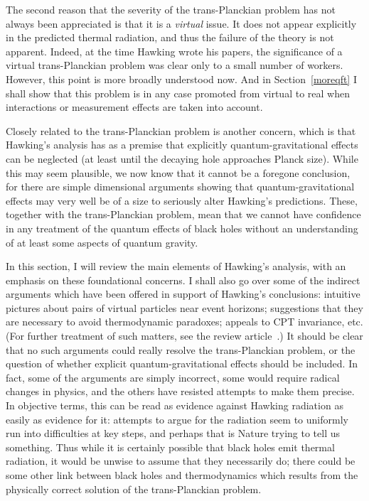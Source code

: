 \documentclass[12pt]{article}
\begin{document}
The second reason that the severity of the trans-Planckian problem has not always been appreciated is that it is a {\em virtual} issue.  It does not appear explicitly in the predicted thermal radiation, and thus the failure of the theory is not apparent.  Indeed, at the time Hawking wrote his papers, the significance of a virtual trans-Planckian problem was clear only to a small number of workers.  However, this point is more broadly understood now.  And in Section~\ref{moreqft} I shall show that this problem is in any case promoted from virtual to real when interactions or measurement effects are taken into account.

Closely related to the trans-Planckian problem is another concern, which is that Hawking's analysis has as a premise that explicitly quantum-gravitational effects can be neglected (at least until the decaying hole approaches Planck size).  While this may seem plausible, we now know that it cannot be a foregone conclusion, for there are simple dimensional arguments showing that
quantum-gravitational effects may very well be of a size to seriously alter Hawking's predictions.
These, together with the trans-Planckian problem, mean that we cannot have confidence in any treatment of the quantum effects of black holes without an understanding of at least some aspects of quantum gravity.

In this section, I will review the main elements of Hawking's analysis, with an emphasis on these foundational concerns.  I shall also go over some of the indirect arguments which have been offered in support of Hawking's conclusions:
intuitive pictures about pairs of virtual particles near event horizons;
suggestions that they are necessary to avoid thermodynamic paradoxes; appeals to CPT invariance, etc.  (For further treatment of such matters, see the review article~\citep{Helfer:2003va}.)
It should be clear that no such arguments could really resolve the trans-Planckian problem, or the question of whether 
explicit quantum-gravitational effects should be included.  In fact, some of the arguments are simply incorrect, some would require radical changes in physics, and the others have resisted attempts to make them precise.  In objective terms,
this can be read as evidence against Hawking radiation as easily as evidence for it:  attempts to argue for the radiation seem to uniformly run into difficulties at key steps, and perhaps that is Nature trying to tell us something.
Thus while it is certainly possible that black holes emit thermal radiation, it would be unwise to assume that they necessarily do; there could be some other link between black holes and thermodynamics which results from the physically correct solution of the trans-Planckian problem.
\end{document}
